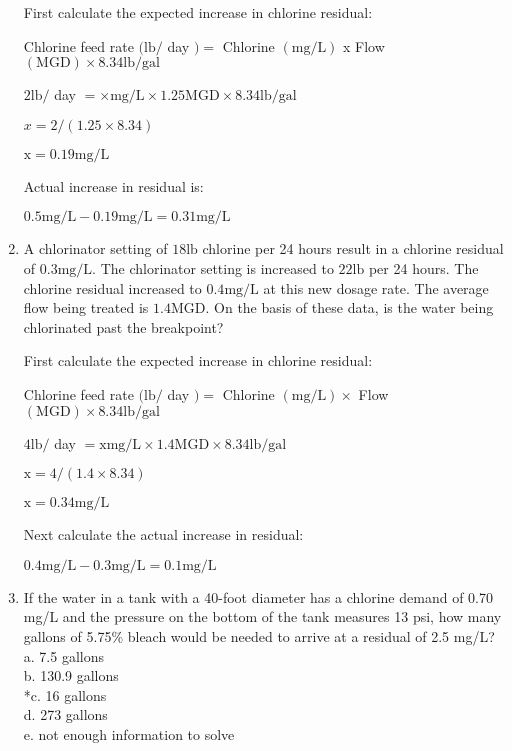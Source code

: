 \documentclass{article}
\begin{document}
\begin{enumerate}
First calculate the expected increase in chlorine residual:

Chlorine feed rate $(\mathrm{lb} /$ day $)=$ Chlorine $(\mathrm{mg} / \mathrm{L})$ x Flow $(\mathrm{MGD}) \times 8.34 \mathrm{lb} / \mathrm{gal}$

$2 \mathrm{lb} /$ day $=\times \mathrm{mg} / \mathrm{L} \times 1.25 \mathrm{MGD} \times 8.34 \mathrm{lb} / \mathrm{gal}$

$x=2 /(1.25 \times 8.34)$

$\mathrm{x}=0.19 \mathrm{mg} / \mathrm{L}$

Actual increase in residual is:

$0.5 \mathrm{mg} / \mathrm{L}-0.19 \mathrm{mg} / \mathrm{L}=0.31 \mathrm{mg} / \mathrm{L}$

\item A chlorinator setting of $18 \mathrm{lb}$ chlorine per 24 hours result in a chlorine residual of $0.3 \mathrm{mg} / \mathrm{L}$. The chlorinator setting is increased to $22 \mathrm{lb}$ per 24 hours. The chlorine residual increased to $0.4 \mathrm{mg} / \mathrm{L}$ at this new dosage rate. The average flow being treated is $1.4 \mathrm{MGD}$. On the basis of these data, is the water being chlorinated past the breakpoint?

First calculate the expected increase in chlorine residual:

Chlorine feed rate $(\mathrm{lb} /$ day $)=$ Chlorine $(\mathrm{mg} / \mathrm{L}) \times$ Flow $(\mathrm{MGD}) \times 8.34 \mathrm{lb} / \mathrm{gal}$

$4 \mathrm{lb} /$ day $=\mathrm{x} \mathrm{mg} / \mathrm{L} \times 1.4 \mathrm{MGD} \times 8.34 \mathrm{lb} / \mathrm{gal}$

$\mathrm{x}=4 /(1.4 \times 8.34)$

$\mathrm{x}=0.34 \mathrm{mg} / \mathrm{L}$

Next calculate the actual increase in residual:

$0.4 \mathrm{mg} / \mathrm{L}-0.3 \mathrm{mg} / \mathrm{L}=0.1 \mathrm{mg} / \mathrm{L}$

\item If the water in a tank with a 40-foot diameter has a chlorine demand of 0.70 mg/L and the pressure on the bottom of the tank measures 13 psi, how many gallons of 5.75\% bleach would be needed to arrive at a residual of 2.5 mg/L?\\
a.	7.5 gallons\\
b.	130.9  gallons\\
*c.	16 gallons\\
d.	273 gallons\\
e.	not enough information to solve




\end{enumerate}
\end{document}
